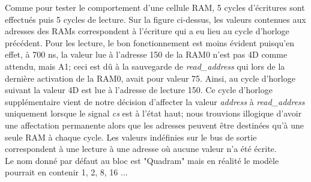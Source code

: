 \indent Comme pour tester le comportement d'une cellule RAM, 5 cycles d'écritures sont effectués puis 5 cycles de lecture.
Sur la figure ci-dessus, les valeurs contenues aux adresses des RAMs correspondent à l'écriture qui a eu lieu au cycle d'horloge précédent.
Pour les lecture, le bon fonctionnement est moins évident puisqu'en effet, à 700 ns, la valeur lue à l'adresse 150 de la RAM0 n'est pas 4D comme attendu, mais A1; ceci est dû à la sauvegarde de \textit{read\_address} qui lors de la dernière activation de la RAM0, avait pour valeur 75.
Ainsi, au cycle d'horloge suivant la valeur 4D est lue à l'adresse de lecture 150.
Ce cycle d'horloge supplémentaire vient de notre décision d'affecter la valeur \textit{address} à \textit{read\_address} uniquement lorsque le signal \textit{cs} est à l'état haut; nous trouvions illogique d'avoir une affectation permanente alors que les adresses peuvent être destinées qu'à une seule RAM à chaque cycle.
Les valeurs indéfinies sur le bus de sortie correspondent à une lecture à une adresse où aucune valeur n'a été écrite. \\

\indent Le nom donné par défaut au bloc est "Quadram" mais en réalité le modèle pourrait en contenir 1, 2, 8, 16 ...

